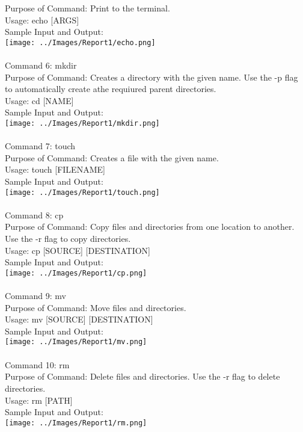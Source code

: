 \documentclass[10pt,a4paper]{report}
\begin{document}
Purpose of Command: Print to the terminal.\\
Usage: echo [ARGS]\\
Sample Input and Output: \\
\texttt{[image: ../Images/Report1/echo.png]}\\
\\
Command 6: mkdir\\
Purpose of Command: Creates a directory with the given name. Use the -p flag to automatically create athe requiured parent directories.\\
Usage: cd [NAME]\\
Sample Input and Output: \\
\texttt{[image: ../Images/Report1/mkdir.png]}\\
\pagebreak
\\
Command 7: touch\\
Purpose of Command: Creates a file with the given name.\\
Usage: touch [FILENAME]\\
Sample Input and Output: \\
\texttt{[image: ../Images/Report1/touch.png]}\\
\\
Command 8: cp\\
Purpose of Command: Copy files and directories from one location to another. Use the -r flag to copy directories.\\
Usage: cp [SOURCE] [DESTINATION]\\
Sample Input and Output: \\
\texttt{[image: ../Images/Report1/cp.png]}\\
\\
Command 9: mv\\
Purpose of Command: Move files and directories.\\
Usage: mv [SOURCE] [DESTINATION]\\
Sample Input and Output: \\
\texttt{[image: ../Images/Report1/mv.png]}\\
\pagebreak
\\
Command 10: rm\\
Purpose of Command: Delete files and directories. Use the -r flag to delete directories.\\
Usage: rm [PATH]\\
Sample Input and Output: \\
\texttt{[image: ../Images/Report1/rm.png]}\\
\end{document}
